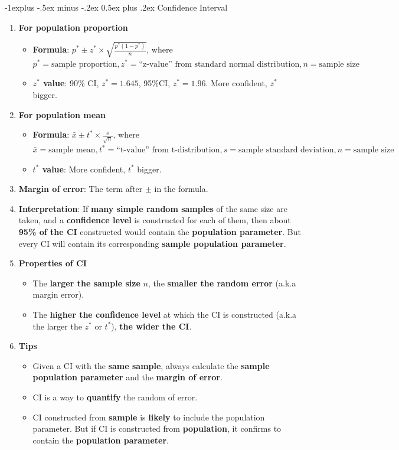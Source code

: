 \documentclass[10pt, landscape]{article}
\makeatletter
\renewcommand{\subsection}{\@startsection{subsection}{2}{0mm}%
                                {-1explus -.5ex minus -.2ex}%
                                {0.5ex plus .2ex}%
                                {\normalfont\normalsize\bfseries}}
\makeatother
\begin{document}
\begin{multicols}{4}
\subsection{Confidence Interval}
\begin{enumerate}
    \item \textbf{For population proportion}
    \begin{itemize}
        \item \textbf{Formula}: $p^*\pm z^*\times\sqrt{\frac{p^*(1-p^*)}{n}}$, where $p^*=\text{sample proportion}, z^*=\text{``z-value'' from standard normal distribution}, n=\text{sample size}$
        \item \textbf{$z^*$ value}: 90\% CI, $z^*=1.645$, 95\%CI, $z^*=1.96$. More confident, $z^*$ bigger.
    \end{itemize}
    \item \textbf{For population mean}
    \begin{itemize}
        \item \textbf{Formula}: $\bar{x}\pm t^*\times \frac{s}{\sqrt{n}}$, where $\bar{x}=\text{sample mean}, t^*=\text{``t-value'' from t-distribution}, s=\text{sample standard deviation}, n=\text{sample size}$
        \item \textbf{$t^*$ value}: More confident, $t^*$ bigger.
    \end{itemize}
    \item \textbf{Margin of error}: The term after $\pm$ in the formula.
    \item \textbf{Interpretation}: If \textbf{many simple random samples} of the same size are taken, and a \textbf{confidence level} is constructed for each of them, then about \textbf{95\% of the CI} constructed would contain the \textbf{population parameter}. But every CI will contain its corresponding \textbf{sample population parameter}.
    \item \textbf{Properties of CI}
    \begin{itemize}
        \item The \textbf{larger the sample size} $n$, the \textbf{smaller the random error} (a.k.a margin error).
        \item The \textbf{higher the confidence level} at which the CI is constructed (a.k.a the larger the $z^*$ or $t^*$), \textbf{the wider the CI}.
    \end{itemize}
    \item \textbf{Tips}
    \begin{itemize}
        \item Given a CI with the \textbf{same sample}, always calculate the \textbf{sample population parameter} and the \textbf{margin of error}.
        \item CI is a way to \textbf{quantify} the random of error.
        \item CI constructed from \textbf{sample} is \textbf{likely} to include the population parameter. But if CI is constructed from \textbf{population}, it confirms to contain the \textbf{population parameter}.
    \end{itemize}
\end{enumerate}

\end{multicols}
\end{document}
